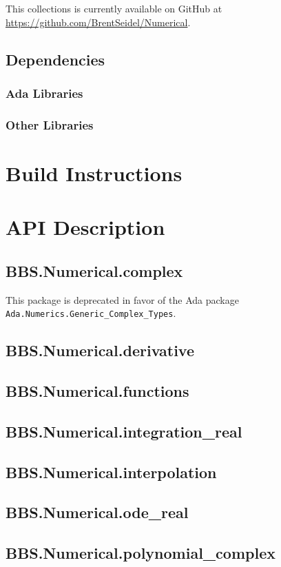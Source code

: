 \documentclass[10pt, openany]{book}
\newcommand{\package}[1]{\texttt{#1}}
\begin{document}
This collections is currently available on GitHub at \url{https://github.com/BrentSeidel/Numerical}.

\section{Dependencies}
\subsection{Ada Libraries}
\subsection{Other Libraries}

\chapter{Build Instructions}

\chapter{API Description}
\section{BBS.Numerical.complex}
This package is deprecated in favor of the Ada package \package{Ada.Numerics.Generic\_Complex\_Types}.

\section{BBS.Numerical.derivative}
\section{BBS.Numerical.functions}
\section{BBS.Numerical.integration\_real}
\section{BBS.Numerical.interpolation}
\section{BBS.Numerical.ode\_real}
\section{BBS.Numerical.polynomial\_complex}
\end{document}
